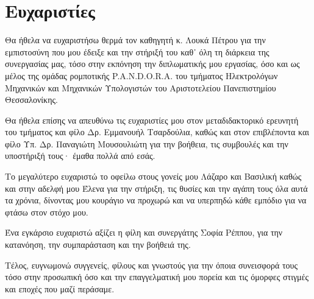 \section*{Ευχαριστίες}
{}


Θα ήθελα να ευχαριστήσω θερμά τον καθηγητή κ. Λουκά Πέτρου
για την εμπιστοσύνη που μου έδειξε και την στήριξή του καθ᾽ όλη τη
διάρκεια της συνεργασίας μας, τόσο στην εκπόνηση την διπλωματικής
μου εργασίας, όσο και ως μέλος της ομάδας ρομποτικής P.A.N.D.O.R.A. του
τμήματος Ηλεκτρολόγων Μηχανικών και Μηχανικών Υπολογιστών
του Αριστοτελείου Πανεπιστημίου Θεσσαλονίκης.

Θα ήθελα επίσης να απευθύνω τις ευχαριστίες μου στον μεταδιδακτορικό
ερευνητή του τμήματος και φίλο Δρ. Εμμανουήλ Τσαρδούλια, καθώς και στον επιβλέποντα
και φίλο Υπ. Δρ. Παναγιώτη Μουσουλιώτη για την βοήθεια, τις συμβουλές και
την υποστήριξή τους· έμαθα πολλά από εσάς.

Το μεγαλύτερο ευχαριστώ το οφείλω στους γονείς μου Λάζαρο και Βασιλική καθώς
και στην αδελφή μου Έλενα για την στήριξη, τις θυσίες και την αγάπη τους όλα αυτά
τα χρόνια, δίνοντας μου κουράγιο να προχωρώ και να υπερπηδώ κάθε εμπόδιο
για να φτάσω στον στόχο μου.

Ένα εγκάρσιο ευχαριστώ αξίζει η φίλη και συνεργάτης Σοφία Ρέππου,
για την κατανόηση, την συμπαράσταση και την βοήθειά της.

Τέλος, ευγνωμονώ συγγενείς, φίλους και γνωστούς για την όποια
συνεισφορά τους τόσο στην προσωπική όσο και την επαγγελματική μου πορεία
και τις όμορφες στιγμές και εποχές που μαζί περάσαμε.

